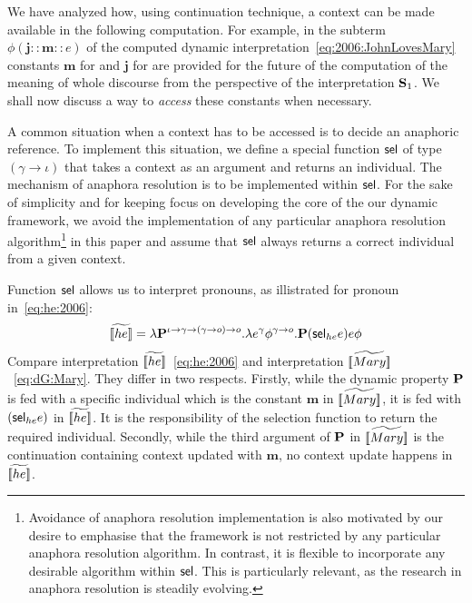 We have analyzed how, using continuation technique, a context can be made available in the following computation. For example, in the subterm $\phi (\textbf{j}::\textbf{m}::e)$ of the computed dynamic interpretation~\eqref{eq:2006:JohnLovesMary} constants $\textbf{m}$ for  and $\textbf{j}$ for  are provided for the future of the computation of the meaning of whole discourse from the perspective of the interpretation $\S_1$. 
We shall now discuss a way to \emph{access} these constants when necessary.

A common situation when a context has to be accessed is to decide an anaphoric reference. To implement this situation, we define a special function $\selK$ of type $(\gamma \rightarrow \iota)$ that takes a context as an argument and returns an individual. The mechanism of anaphora resolution is to be implemented within $\selK$. For the sake of simplicity and for keeping focus on developing the core of the our dynamic framework, we avoid the implementation of any particular anaphora resolution algorithm\footnote{Avoidance of anaphora resolution implementation is also motivated by our desire to emphasise that the framework is not restricted by any particular anaphora resolution algorithm. In contrast, it is flexible to incorporate any desirable algorithm within $\selK$. This is particularly relevant, as the research in anaphora resolution is steadily evolving.} in this paper and assume that $\selK$ always returns a correct individual from a given context. 

Function $\selK$ allows us to interpret pronouns, as illistrated for pronoun  in~\eqref{eq:he:2006}:
\begin{align}
\etr{\I{he}} =  \lambda \P2^{\iota \rightarrow \gamma \rightarrow (\gamma \rightarrow o) \rightarrow o}. \lambda e^{\gamma} \phi^{\gamma \rightarrow o}. \P2 ( \selK_{he} e ) e \phi  \label{eq:he:2006}
\end{align}
Compare interpretation $\etr{\I{he}}$~\eqref{eq:he:2006} and interpretation $\etr{\I{Mary}}$~\eqref{eq:dG:Mary}. They differ in two respects. Firstly, while the dynamic property $\P2$ is fed with a specific individual which is the constant $\textbf{m}$ in $\etr{\I{Mary}}$, it is fed with $( \selK_{he} e )$ in $\etr{\I{he}}$. It is the responsibility of the selection function to return the required individual. Secondly, while the third argument of $\P2$ in $\etr{\I{Mary}}$ is the continuation containing context updated with $\textbf{m}$, no context update happens in $\etr{\I{he}}$.

